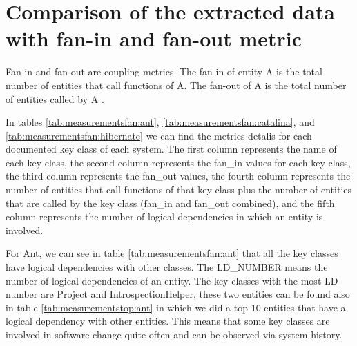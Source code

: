 \documentclass[12pt]{mitthesis}
\begin{document}
\begin{table}[!h]
\renewcommand{\arraystretch}{1}
\caption{Ratio between structural and logical dependencies (SD/LD)}
\label{tab:ratio_sd_ld}
\centering
{}
\end{table}



\section{Comparison of the extracted data with fan-in and fan-out metric}
\label{sec:metrics}

Fan-in and fan-out are coupling metrics. The fan-in of entity A is the total number of entities that call functions of A. The fan-out of A is the total number of entities called by A \cite{5507329}.


In tables \ref{tab:measurementsfan:ant}, \ref{tab:measurementsfan:catalina}, and \ref{tab:measurementsfan:hibernate} we can find the metrics detalis for each documented key class of each system.
The first column represents the name of each key class, the second column represents the fan\_in values for each key class, the third column represents the fan\_out values, the fourth column represents the number of entities that call functions of that key class plus the number of entities that are called by the key class (fan\_in and fan\_out combined), and the fifth column represents the number of logical dependencies in which an entity is involved. 

For Ant, we can see in table \ref{tab:measurementsfan:ant} that all the key classes have logical dependencies with other classes. The LD\_NUMBER means the number of logical dependencies of an entity. The key classes with the most LD number are Project and IntrospectionHelper, these two entities can be found also in table \ref{tab:measurementstop:ant} in which we did a top 10 entities that have a logical dependency with other entities. This means that some key classes are involved in software change quite often and can be observed via system history.
\end{document}
